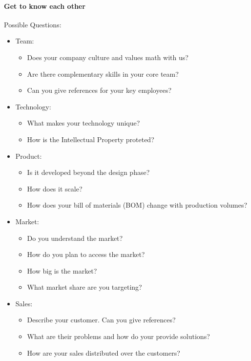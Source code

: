 \paragraph{Get to know each other}
Possible Questions:
\begin{itemize}
    \item Team:
        \begin{itemize}
            \item Does your company culture and values math with us?
            \item Are there complementary skills in your core team?
            \item Can you give references for your key employees? 
        \end{itemize}
    \item Technology:
        \begin{itemize}
            \item What makes your technology unique?
            \item How is the Intellectual Property proteted?
        \end{itemize}
    \item Product:
        \begin{itemize}
            \item Is it developed beyond the design phase?
            \item How does it scale?
            \item How does your bill of materials (BOM) change with production volumes?
        \end{itemize}
    \item Market:
        \begin{itemize}
            \item Do you understand the market?
            \item How do you plan to access the market?
            \item How big is the market?
            \item What market share are you targeting?
        \end{itemize}
    \item Sales:
        \begin{itemize}
            \item Describe your customer. Can you give references?
            \item What are their problems and how do your provide solutions?
            \item How are your sales distributed over the customers?

\end{itemize}
\end{itemize}

